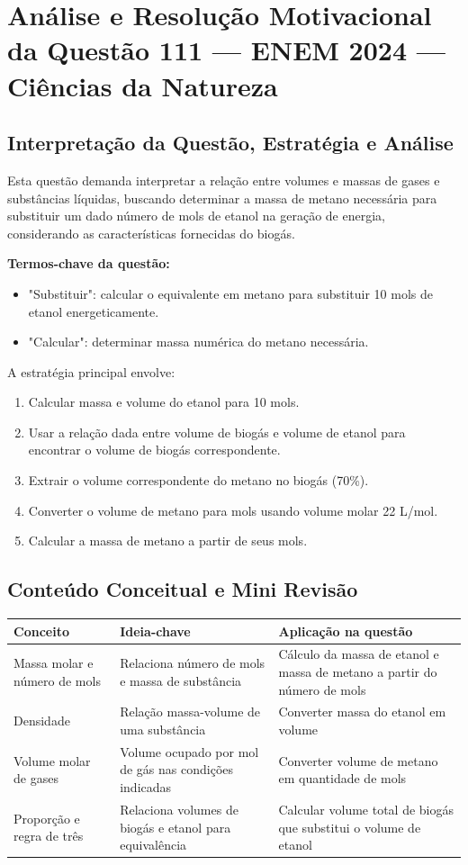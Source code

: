 \documentclass{article}
\begin{document}
\section*{Análise e Resolução Motivacional da Questão 111 — ENEM 2024 — Ciências da Natureza}

\subsection*{Interpretação da Questão, Estratégia e Análise}

Esta questão demanda interpretar a relação entre volumes e massas de gases e substâncias líquidas, buscando determinar a massa de metano necessária para substituir um dado número de mols de etanol na geração de energia, considerando as características fornecidas do biogás.

\textbf{Termos-chave da questão:}
\begin{itemize}
  \item "Substituir": calcular o equivalente em metano para substituir 10 mols de etanol energeticamente.
  \item "Calcular": determinar massa numérica do metano necessária.
\end{itemize}

A estratégia principal envolve:
\begin{enumerate}
  \item Calcular massa e volume do etanol para 10 mols.
  \item Usar a relação dada entre volume de biogás e volume de etanol para encontrar o volume de biogás correspondente.
  \item Extrair o volume correspondente do metano no biogás (70\%).
  \item Converter o volume de metano para mols usando volume molar 22 L/mol.
  \item Calcular a massa de metano a partir de seus mols.
\end{enumerate}

\subsection*{Conteúdo Conceitual e Mini Revisão}

\begin{tabular}{|p{4cm}|p{6cm}|p{6cm}|}
\hline
\textbf{Conceito} & \textbf{Ideia-chave} & \textbf{Aplicação na questão} \\
\hline
Massa molar e número de mols & Relaciona número de mols e massa de substância & Cálculo da massa de etanol e massa de metano a partir do número de mols \\
\hline
Densidade & Relação massa-volume de uma substância & Converter massa do etanol em volume \\
\hline
Volume molar de gases & Volume ocupado por mol de gás nas condições indicadas & Converter volume de metano em quantidade de mols \\
\hline
Proporção e regra de três & Relaciona volumes de biogás e etanol para equivalência & Calcular volume total de biogás que substitui o volume de etanol \\
\hline
\end{tabular}
\end{document}
